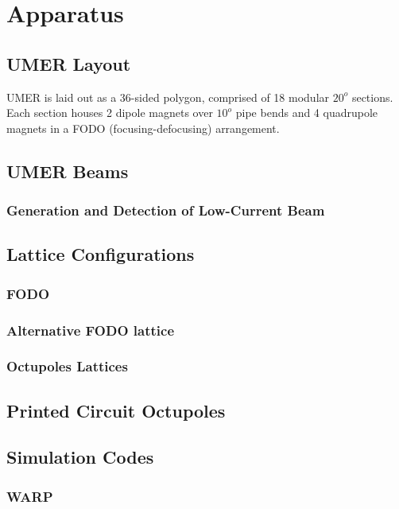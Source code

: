 
\renewcommand{\thechapter}{3}

\chapter{Apparatus}
\label{ch:apparatus}

\section{UMER Layout}

UMER is laid out as a 36-sided polygon, comprised of 18 modular $20^o$ sections. Each section houses 2 dipole magnets over $10^o$ pipe bends and 4 quadrupole magnets in a FODO (focusing-defocusing) arrangement.

\section{UMER Beams}
	\subsection{Generation and Detection of Low-Current Beam}
	
\section{Lattice Configurations}
\subsection{FODO}
\subsection{Alternative FODO lattice}
\subsection{Octupoles Lattices}

\section{Printed Circuit Octupoles}

\section{Simulation Codes}
\subsection{WARP}
